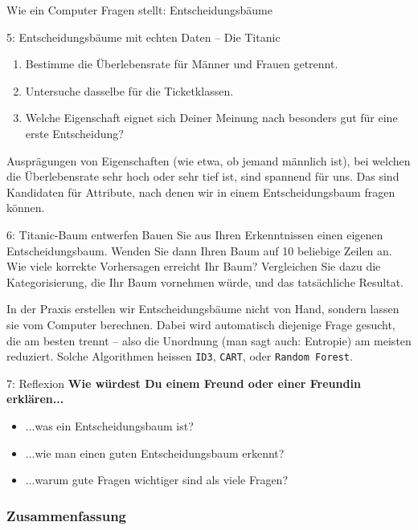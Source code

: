 \begin{lpu}{Wie ein Computer Fragen stellt: Entscheidungsbäume}
\begin{aufgabe}{5: Entscheidungsbäume mit echten Daten – Die Titanic}
\begin{enumerate}
  \item Bestimme die Überlebensrate für Männer und Frauen getrennt.
  \item Untersuche dasselbe für die Ticketklassen.
  \item Welche Eigenschaft eignet sich Deiner Meinung nach besonders gut für eine erste Entscheidung?
\end{enumerate}
\end{aufgabe}

Ausprägungen von Eigenschaften (wie etwa, ob jemand männlich ist), bei welchen die Überlebensrate sehr hoch oder sehr tief ist, sind spannend für uns. Das sind Kandidaten für Attribute, nach denen wir in einem Entscheidungsbaum fragen können.

\begin{aufgabe}{6: Titanic-Baum entwerfen}
Bauen Sie aus Ihren Erkenntnissen einen eigenen Entscheidungsbaum. Wenden Sie dann Ihren Baum auf 10 beliebige Zeilen an. Wie viele korrekte Vorhersagen erreicht Ihr Baum? Vergleichen Sie dazu die Kategorisierung, die Ihr Baum vornehmen würde, und das tatsächliche Resultat.
\end{aufgabe}

\begin{hinweis}
In der Praxis erstellen wir Entscheidungsbäume nicht von Hand, sondern lassen sie vom Computer berechnen. Dabei wird automatisch diejenige Frage gesucht, die am besten trennt – also die Unordnung (man sagt auch: Entropie) am meisten reduziert. Solche Algorithmen heissen \texttt{ID3}, \texttt{CART}, oder \texttt{Random Forest}.
\end{hinweis}

\begin{aufgabe}{7: Reflexion}
\textbf{Wie würdest Du einem Freund oder einer Freundin erklären...}
\begin{itemize}
  \item ...was ein Entscheidungsbaum ist?
  \item ...wie man einen guten Entscheidungsbaum erkennt?
  \item ...warum gute Fragen wichtiger sind als viele Fragen?
\end{itemize}
\end{aufgabe}
    
\end{lpu}

\subsubsection*{Zusammenfassung}

